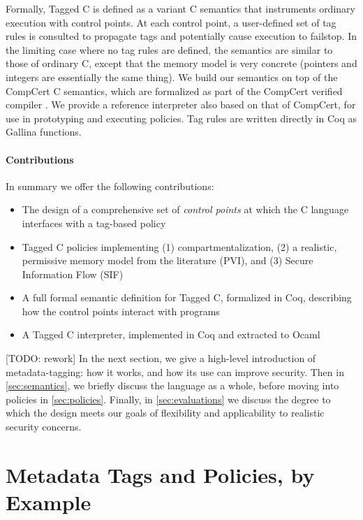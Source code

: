 \documentclass{llncs}
\begin{document}
{  Formally, Tagged C is defined as a variant C semantics that instruments ordinary execution with control points. At each control point,
  a user-defined set of tag rules is consulted to propagate tags and potentially cause execution to failstop.
  In the limiting case where no tag rules are defined, the semantics are similar to those of ordinary C, except that the memory model is very concrete
  (pointers and integers are essentially the same thing).
  We build our semantics on top of the CompCert C semantics, which are formalized 
  as part of the CompCert verified compiler \cite{Leroy09:CompCert}. We provide a reference interpreter
  also based on that of CompCert, for use in prototyping and executing policies. Tag rules are written directly in Coq as Gallina
  functions.

\paragraph{Contributions}

In summary we offer the following contributions:

\begin{itemize}
\item The design of a comprehensive set of {\em control points} at which the C language interfaces with a tag-based policy
\item Tagged C policies implementing (1) compartmentalization,
  (2) a realistic, permissive memory model from the literature (PVI),
  and (3) Secure Information Flow (SIF)
\item A full formal semantic definition for Tagged C, formalized in Coq, describing how the control points
  interact with programs
\item A Tagged C interpreter, implemented in Coq and extracted to Ocaml
\end{itemize}

[TODO: rework]
In the next section, we give a high-level introduction of metadata-tagging: how it works,
and how its use can improve security. Then in \cref{sec:semantics}, we briefly discuss the
language as a whole, before moving into policies in \cref{sec:policies}. Finally, in
\cref{sec:evaluations} we discuss the degree to
which the design meets our goals of flexibility and applicability to realistic
security concerns.

\section{Metadata Tags and Policies, by Example}

}
\end{document}
